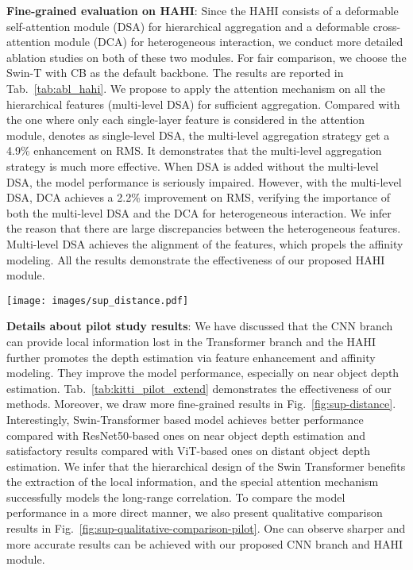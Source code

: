 \documentclass[twocolumn]{svjour3}    \pdfoutput=1
\begin{document}
\textbf{Fine-grained evaluation on HAHI}:
Since the HAHI consists of a deformable self-attention module (DSA) for hierarchical aggregation and a deformable cross-attention module (DCA) for heterogeneous interaction, we conduct more detailed ablation studies on both of these two modules. For fair comparison, we choose the Swin-T with CB as the default backbone. The results are reported in Tab.~\ref{tab:abl_hahi}. We propose to apply the attention mechanism on all the hierarchical features (multi-level DSA) for sufficient aggregation. 
Compared with the one where only each single-layer feature is considered in the attention module, denotes as single-level DSA, the multi-level aggregation strategy get a 4.9\% enhancement on RMS. It demonstrates that the multi-level aggregation strategy is much more effective.
When DSA is added without the multi-level DSA, the model performance is seriously impaired. However, with the multi-level DSA, DCA achieves a 2.2\% improvement on RMS, verifying the importance of both the multi-level DSA and the DCA for heterogeneous interaction. We infer the reason that there are large discrepancies between the heterogeneous features. Multi-level DSA achieves the alignment of the features, which propels the affinity modeling. All the results demonstrate the effectiveness of our proposed HAHI module.

\begin{figure*}
    \centering
    \footnotesize
    \texttt{[image: images/sup\_distance.pdf]}
    \caption{Fine-grained quantitative results of our pilot study on KITTI datset. We divide the depth range (0 - 80) into 80 intervals. Point  in the plot represents the abs rel of the model is  on depth interval . Our method achieves a trade off between long and short range estimation.}
    \label{fig:sup-distance}
\end{figure*}

\textbf{Details about pilot study results}:
We have discussed that the CNN branch can provide local information lost in the Transformer branch and the HAHI further promotes the depth estimation via feature enhancement and affinity modeling. They improve the model performance, especially on near object depth estimation. Tab.~\ref{tab:kitti_pilot_extend} demonstrates the effectiveness of our methods. Moreover, we draw more fine-grained results in Fig.~\ref{fig:sup-distance}. Interestingly, Swin-Transformer based model achieves better performance compared with ResNet50-based ones on near object depth estimation and satisfactory results compared with ViT-based ones on distant object depth estimation. We infer that the hierarchical design of the Swin Transformer benefits the extraction of the local information, and the special attention mechanism successfully models the long-range correlation. To compare the model performance in a more direct manner, we also present qualitative comparison results in Fig.~\ref{fig:sup-qualitative-comparison-pilot}. One can observe sharper and more accurate results can be achieved with our proposed CNN branch and HAHI module. 
\end{document}
